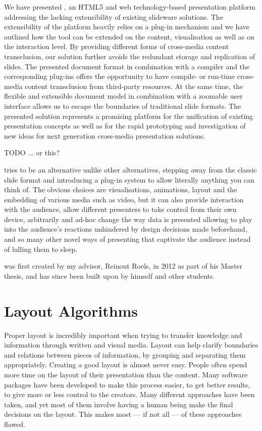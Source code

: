     We have presented \mxp, an HTML5 and web technology-based presentation
    platform addressing the lacking extensibility of existing slideware
    solutions. The extensibility of the \mxp platform heavily relies on a
    plug-in mechanism and we have outlined how the tool can be extended on the
    content, visualisation as well as on the interaction level. By providing
    different forms of cross-media content transclusion, our solution further
    avoids the redundant storage and replication of slides. The presented \mxp
    document format in combination with a compiler and the corresponding
    plug-ins offers the opportunity to have compile- or run-time cross-media
    content transclusion from third-party resources. At the same time, the
    flexible and extensible document model in combination with a zoomable user
    interface allows us to escape the boundaries of traditional slide formats.
    The presented \mxp solution represents a promising platform for the
    unification of existing presentation concepts as well as for the rapid
    prototyping and investigation of new ideas for next generation cross-media
    presentation solutions.

    TODO ... or this?

    \mxp tries to be an alternative unlike other alternatives, stepping away
    from the classic slide format and introducing a plug-in system to allow
    literally anything you can think of. The obvious choices are
    visualisations, animations, layout and the embedding of various media such
    as video, but it can also provide interaction with the audience, allow
    different presenters to take control from their own device, arbitrarily and
    ad-hoc change the way data is presented allowing to play into the
    audience's reactions unhindered by design decisions made beforehand, and so
    many other novel ways of presenting that captivate the audience instead of
    lulling them to sleep.

    \mxp was first created by my advisor, Reinout Roels, in 2012 as part of his
    Master thesis, and has since been built upon by himself and other students.


  \section{Layout Algorithms}
   \label{layout-algorithms}

   Proper layout is incredibly important when trying to transfer knowledge and
   information through written and visual media. Layout can help clarify
   boundaries and relations between pieces of information, by grouping and
   separating them appropriately. Creating a good layout is almost never easy.
   People often spend more time on the layout of their presentation than the
   content. Many software packages have been developed to make this process
   easier, to get better results, to give more or less control to the creators.
   Many different approaches have been taken, and yet most of them involve
   having a human being make the final decisions on the layout. This makes most
   --- if not all --- of these approaches flawed. 

